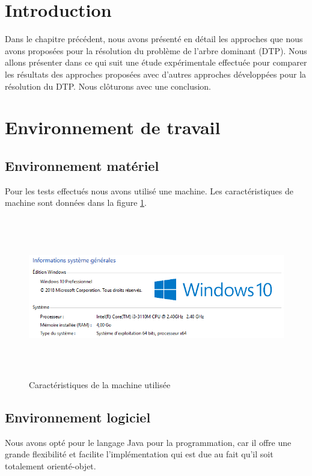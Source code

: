 


\section{Introduction}
Dans le chapitre précédent, nous avons présenté en détail les approches que nous avons proposées pour la résolution du problème de l’arbre dominant (DTP). Nous allons présenter dans ce qui suit une étude expérimentale effectuée pour comparer les résultats des approches proposées avec d’autres approches développées pour la résolution du DTP. Nous clôturons avec une conclusion.


\section{Environnement de travail}

\subsection{Environnement matériel}
Pour les tests effectués nous avons utilisé une machine. Les caractéristiques de  machine sont données dans la figure \ref{fig:CMU}.

\begin{figure}[H]
	\centering
	\includegraphics[width=16cm,height=7cm]{Chap5/1.png}
	\caption{Caractéristiques de la machine utilisée}
	\label{fig:CMU}
\end{figure}

\subsection{Environnement logiciel}
Nous avons opté pour le langage Java pour la programmation, car il offre une grande flexibilité et facilite l’implémentation qui est due au fait qu’il soit totalement orienté-objet.

